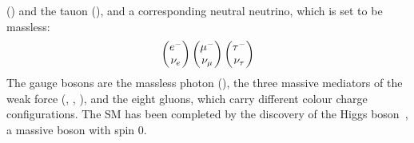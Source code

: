 (\muon) and the tauon (\tauon), and a corresponding neutral neutrino, which is
set to be massless:
\begin{align}
\begin{pmatrix}
{\ensuremath{e^-}} \\ {{\nu}_e}
\end{pmatrix}
\begin{pmatrix}
{\ensuremath{\mu^-}} \\ {{\nu}_\mu}
\end{pmatrix}
\begin{pmatrix}
{\ensuremath{\tau^-}} \\ {{\nu}_\tau}
\end{pmatrix}
\end{align}
The gauge bosons are the massless photon (\g), the three massive mediators of
the weak force (\Wp, \Wm, \Z), and the eight gluons, which carry different
colour charge configurations. The SM has been completed by the discovery of
the Higgs boson~\cite{Higgs-Atlas,Higgs-CMS}, a massive boson with spin 0.
